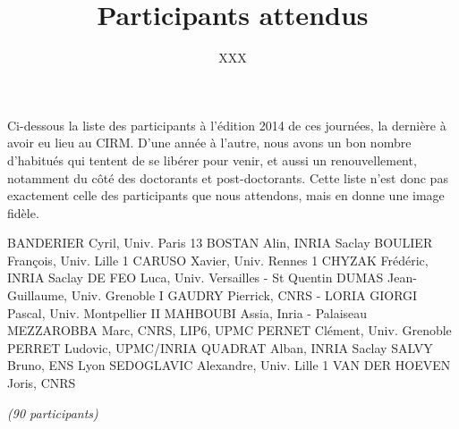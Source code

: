 \documentclass{paper}
\title{Participants attendus}
\subtitle{XXX}
\date{}
\begin{document}
\maketitle
\thispagestyle{empty}

Ci-dessous la liste des participants à l'édition 2014 de ces journées, la dernière à avoir eu lieu au CIRM.
D’une année à l’autre, nous avons un bon nombre d’habitués qui tentent de se libérer pour venir, et aussi un renouvellement, notamment du côté des doctorants et post-doctorants.
Cette liste n’est donc pas exactement celle des participants que nous attendons, mais en donne une image fidèle.

\bigskip

\obeylines
BANDERIER Cyril, Univ. Paris 13
BOSTAN Alin, INRIA Saclay
BOULIER François, Univ. Lille 1
CARUSO Xavier, Univ. Rennes 1
CHYZAK Frédéric, INRIA Saclay
DE FEO Luca, Univ. Versailles - St Quentin
DUMAS Jean-Guillaume, Univ. Grenoble I
GAUDRY Pierrick, CNRS - LORIA
GIORGI Pascal, Univ. Montpellier II
MAHBOUBI Assia, Inria - Palaiseau
MEZZAROBBA Marc, CNRS, LIP6, UPMC
PERNET Clément, Univ. Grenoble
PERRET Ludovic, UPMC/INRIA
QUADRAT Alban, INRIA Saclay
SALVY Bruno, ENS Lyon
SEDOGLAVIC Alexandre, Univ. Lille 1
VAN DER HOEVEN Joris, CNRS

\medskip
\emph{(90 participants)}
\end{document}
